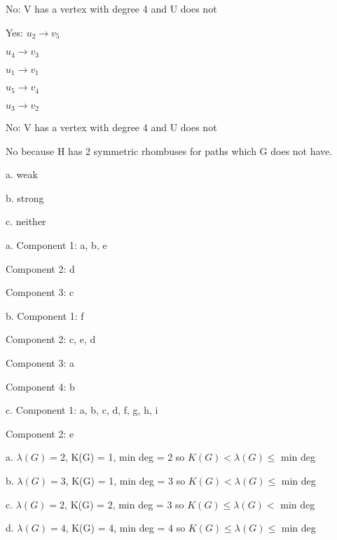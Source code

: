 \documentclass[12pt]{article}
\newenvironment{problem}[2][Problem]{\begin{trivlist}
\item[\hskip \labelsep {\bfseries #1}\hskip \labelsep {\bfseries #2.}]}{\end{trivlist}}
\begin{document}
\begin{problem}{10.3.36}
\end{problem}

No: V has a vertex with degree 4 and U does not

\begin{problem}{10.3.38}
\end{problem}

Yes: $u_2 \rightarrow v_5$

$u_4 \rightarrow v_3$

$u_1 \rightarrow v_1$

$u_5 \rightarrow v_4$

$u_3 \rightarrow v_2$

\begin{problem}{10.3.40}
\end{problem}

No: V has a vertex with degree 4 and U does not

\begin{problem}{10.4.22}
\end{problem}

No because H has 2 symmetric rhombuses for paths which G does not have.

\begin{problem}{10.4.12}
\end{problem}

a. weak

b. strong

c. neither 

\begin{problem}{10.4.14}
\end{problem}

a. Component 1: a, b, e 

Component 2: d 

Component 3: c

b. Component 1: f

Component 2: c, e, d

Component 3: a

Component 4: b

c. Component 1: a, b, c, d, f, g, h, i

Component 2: e

\begin{problem}{10.4.50}
\end{problem}

a. $\lambda(G) = 2$, K(G) = 1, min deg = 2 so $K(G) < \lambda(G) \leq$ min deg

b. $\lambda(G) = 3$, K(G) = 1, min deg = 3 so $K(G) < \lambda(G) \leq$ min deg

c. $\lambda(G) = 2$, K(G) = 2, min deg = 3 so $K(G) \leq \lambda(G) <$ min deg

d. $\lambda(G) = 4$, K(G) = 4, min deg = 4 so $K(G) \leq \lambda(G) \leq$ min deg
\end{document}
